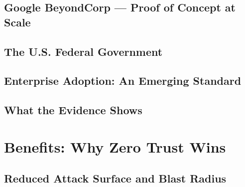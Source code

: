 \documentclass[12pt, letterpaper]{article}
\begin{document}
\subsection{Google BeyondCorp — Proof of Concept at Scale}

\subsection{The U.S. Federal Government}

\subsection{Enterprise Adoption: An Emerging Standard}

\subsection{What the Evidence Shows}

\section{Benefits: Why Zero Trust Wins}

\subsection{Reduced Attack Surface and Blast Radius}
\end{document}
